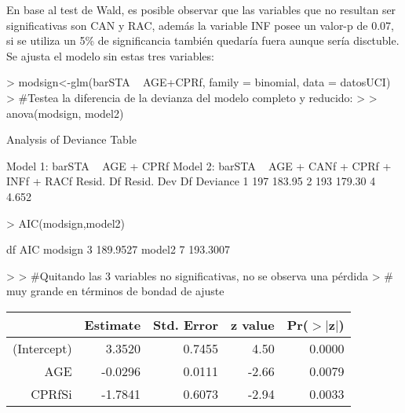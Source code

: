\documentclass[11pt,onside]{article}
\begin{document}
\begin{itemize}
En base al test de Wald, es posible observar que las variables que no resultan ser significativas son CAN y RAC, además la variable INF posee un valor-p de 0.07, si se utiliza un 5\% de significancia también quedaría fuera aunque sería disctuble. Se ajusta el modelo sin estas tres variables:

\begin{Schunk}
\begin{Sinput}
> modsign<-glm(barSTA ~ AGE+CPRf, family = binomial, data = datosUCI)
> #Testea la diferencia de la devianza del modelo completo y reducido:
> 
> anova(modsign, model2)
\end{Sinput}
\begin{Soutput}
Analysis of Deviance Table

Model 1: barSTA ~ AGE + CPRf
Model 2: barSTA ~ AGE + CANf + CPRf + INFf + RACf
  Resid. Df Resid. Dev Df Deviance
1       197     183.95            
2       193     179.30  4    4.652
\end{Soutput}
\begin{Sinput}
> AIC(modsign,model2)
\end{Sinput}
\begin{Soutput}
        df      AIC
modsign  3 189.9527
model2   7 193.3007
\end{Soutput}
\begin{Sinput}
> 
> #Quitando las 3 variables no significativas, no se observa una pérdida
> # muy grande en términos de bondad de ajuste
\end{Sinput}
\end{Schunk}

\begin{Schunk}
\begin{Soutput}
% latex table generated in R 4.0.5 by xtable 1.8-4 package
% Thu Jun 10 14:41:36 2021
\begin{table}[ht]
\centering
\begin{tabular}{rrrrr}
  \hline
 & Estimate & Std. Error & z value & Pr($>$$|$z$|$) \\ 
  \hline
(Intercept) & 3.3520 & 0.7455 & 4.50 & 0.0000 \\ 
  AGE & -0.0296 & 0.0111 & -2.66 & 0.0079 \\ 
  CPRfSi & -1.7841 & 0.6073 & -2.94 & 0.0033 \\ 
   \hline
\end{tabular}
\end{table}
\end{Soutput}
\end{Schunk}


\end{itemize}
\end{document}
